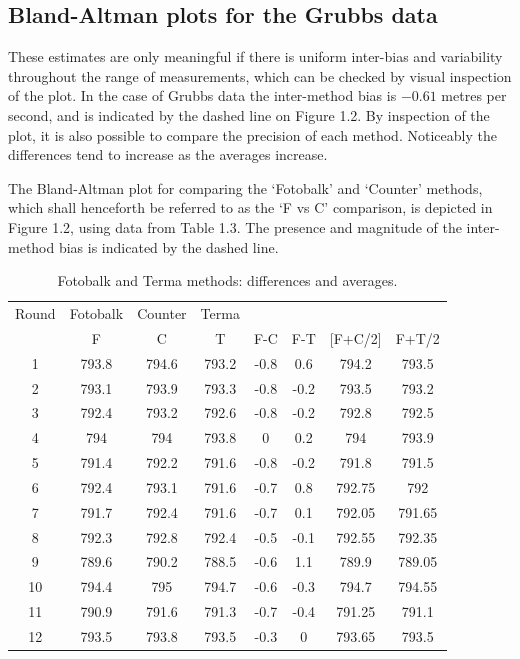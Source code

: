 \documentclass[Main.tex]{subfiles}
\begin{document}
\subsection{Bland-Altman plots for the Grubbs data}
These estimates are only meaningful if there is uniform inter-bias and variability throughout the
range of measurements, which can be checked by visual inspection of the plot. In the case of Grubbs data the inter-method bias is $-0.61$ metres per second, and is indicated by the dashed line on Figure 1.2. By inspection of the plot, it is also possible to
compare the precision of each method. Noticeably the differences tend to increase as the averages increase.


	
The Bland-Altman plot for comparing the `Fotobalk' and `Counter' methods, which shall henceforth be referred to as the `F vs C'
comparison,  is depicted in Figure 1.2, using data from Table 1.3. The presence and magnitude of the inter-method bias is indicated
	by the dashed line.

	
	

	
	\begin{table}[h!]
		\renewcommand\arraystretch{0.7}%
		\begin{center}
			\begin{tabular}{|c||c|c|c||c|c||c|c|}
				\hline

Round	&	Fotobalk	&	Counter	&	Terma	&		&		&		&		\\
&	F	&	C	&	T	&	F-C	&	F-T	&	[F+C/2]	&	F+T/2	\\ \hline
1	&	793.8	&	794.6	&	793.2	&	-0.8	&	0.6	&	794.2	&	793.5	\\
2	&	793.1	&	793.9	&	793.3	&	-0.8	&	-0.2	&	793.5	&	793.2	\\
3	&	792.4	&	793.2	&	792.6	&	-0.8	&	-0.2	&	792.8	&	792.5	\\
4	&	794	&	794	&	793.8	&	0	&	0.2	&	794	&	793.9	\\
5	&	791.4	&	792.2	&	791.6	&	-0.8	&	-0.2	&	791.8	&	791.5	\\
6	&	792.4	&	793.1	&	791.6	&	-0.7	&	0.8	&	792.75	&	792	\\
7	&	791.7	&	792.4	&	791.6	&	-0.7	&	0.1	&	792.05	&	791.65	\\
8	&	792.3	&	792.8	&	792.4	&	-0.5	&	-0.1	&	792.55	&	792.35	\\
9	&	789.6	&	790.2	&	788.5	&	-0.6	&	1.1	&	789.9	&	789.05	\\
10	&	794.4	&	795	&	794.7	&	-0.6	&	-0.3	&	794.7	&	794.55	\\
11	&	790.9	&	791.6	&	791.3	&	-0.7	&	-0.4	&	791.25	&	791.1	\\
12	&	793.5	&	793.8	&	793.5	&	-0.3	&	0	&	793.65	&	793.5	\\

				
				\hline
			\end{tabular}
			\caption{Fotobalk and Terma methods: differences and averages.}
		\end{center}
	\end{table}
	
\end{document}
